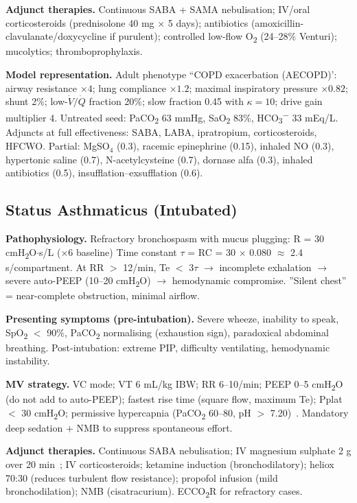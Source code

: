 \textbf{Adjunct therapies.} Continuous SABA + SAMA nebulisation; IV/oral corticosteroids (prednisolone 40 mg $\times$ 5 days); antibiotics (amoxicillin-clavulanate/doxycycline if purulent); controlled low-flow O\textsubscript{2} (24--28\% Venturi); mucolytics; thromboprophylaxis.

\textbf{Model representation.} Adult phenotype ``COPD exacerbation (AECOPD)': airway resistance $\times4$; lung compliance $\times1.2$; maximal inspiratory pressure $\times0.82$; shunt 2\%; low-$\dot V/\dot Q$ fraction 20\%; slow fraction 0.45 with $\kappa=10$; drive gain multiplier 4. Untreated seed: PaCO\textsubscript{2} 63 mmHg, SaO\textsubscript{2} 83\%, HCO\textsubscript{3}\textsuperscript{$-$} 33 mEq/L. Adjuncts at full effectiveness: SABA, LABA, ipratropium, corticosteroids, HFCWO. Partial: MgSO$_4$ (0.3), racemic epinephrine (0.15), inhaled NO (0.3), hypertonic saline (0.7), N-acetylcysteine (0.7), dornase alfa (0.3), inhaled antibiotics (0.5), insufflation--exsufflation (0.6).

\subsection{Status Asthmaticus (Intubated)}
\textbf{Pathophysiology.} Refractory bronchospasm with mucus plugging: R = 30 cmH\textsubscript{2}O$\cdot$s/L ($\times$6 baseline) Time constant $\tau$ = RC = 30 $\times$ 0.080 $\approx$ 2.4 s/compartment. At RR $>$ 12/min, Te $<$ 3$\tau$ $\to$ incomplete exhalation $\to$ severe auto-PEEP (10--20 cmH\textsubscript{2}O) $\to$ hemodynamic compromise. ''Silent chest'' = near-complete obstruction, minimal airflow.

\textbf{Presenting symptoms (pre-intubation).} Severe wheeze, inability to speak, SpO\textsubscript{2} $<$ 90\%, PaCO\textsubscript{2} normalising (exhaustion sign), paradoxical abdominal breathing. Post-intubation: extreme PIP, difficulty ventilating, hemodynamic instability.

\textbf{MV strategy.} VC mode; VT 6 mL/kg IBW; RR 6--10/min; PEEP 0--5 cmH\textsubscript{2}O (do not add to auto-PEEP); fastest rise time (square flow, maximum Te); Pplat $<$ 30 cmH\textsubscript{2}O; permissive hypercapnia (PaCO\textsubscript{2} 60--80, pH $>$ 7.20)~\citep{tuxen1987,leatherman2004}. Mandatory deep sedation + NMB to suppress spontaneous effort.

\textbf{Adjunct therapies.} Continuous SABA nebulisation; IV magnesium sulphate 2 g over 20 min~\citep{rowe2000}; IV corticosteroids; ketamine induction (bronchodilatory); heliox 70:30 (reduces turbulent flow resistance); propofol infusion (mild bronchodilation); NMB (cisatracurium). ECCO\textsubscript{2}R for refractory cases.

